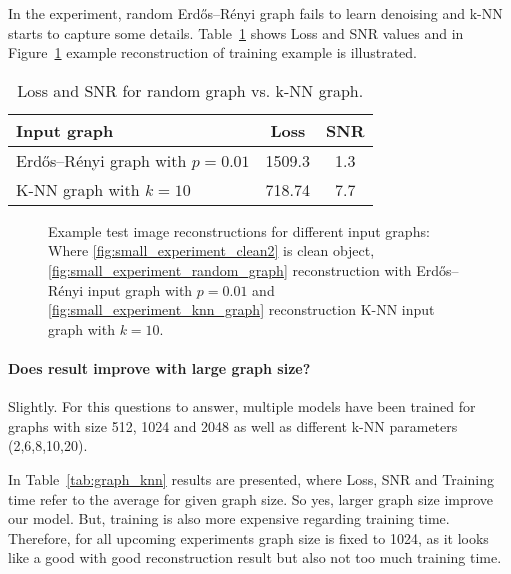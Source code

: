   In the experiment, random Erdős–Rényi graph fails to learn denoising and k-NN starts to capture some details.
  Table~\ref{tab:input_graph} shows Loss and SNR values and in Figure~\ref{fig:input_graph_small} example reconstruction 
  of training example is illustrated.

  \begin{table}[H]
    \centering
      \begin{tabular}{l|cc}
      \toprule
      \textbf{Input graph} & \textbf{Loss} & \textbf{SNR}  \\ 
      \midrule
      Erdős–Rényi graph with $p=0.01$    &  1509.3          &  1.3   \\ \hline
      K-NN graph with $k=10$       &  718.74          &  7.7    \\ \hline
      \midrule
      \end{tabular}
    \caption{Loss and SNR for random graph vs. k-NN graph. }
    \label{tab:input_graph}
  \end{table}
  
  \begin{figure}[H]
    \label{fig:input_graph_small}
    \hfill
    \hfill
    \hfill
    \hfill
	\caption{Example test image reconstructions for different input graphs:\\
  Where \ref{fig:small_experiment_clean2} is clean object, 
  \ref{fig:small_experiment_random_graph} reconstruction with  Erdős–Rényi input graph with $p=0.01$ and 
  \ref{fig:small_experiment_knn_graph} reconstruction K-NN input graph with $k=10$.
  }
\end{figure}


  \paragraph{Does result improve with large graph size?}
  Slightly.
  For this questions to answer, multiple models have been trained for graphs with size 512, 1024 and 2048 
  as well as different k-NN parameters (2,6,8,10,20).

  In Table~\ref{tab:graph_knn} results are presented, where Loss, SNR and Training time refer to 
  the average for given graph size. So yes, larger graph size improve our model. 
  But, training is also more expensive regarding training time. 
  Therefore, for all upcoming experiments graph size is fixed to 1024, as it looks like a good
  with good reconstruction result but also not too much training time.
  
